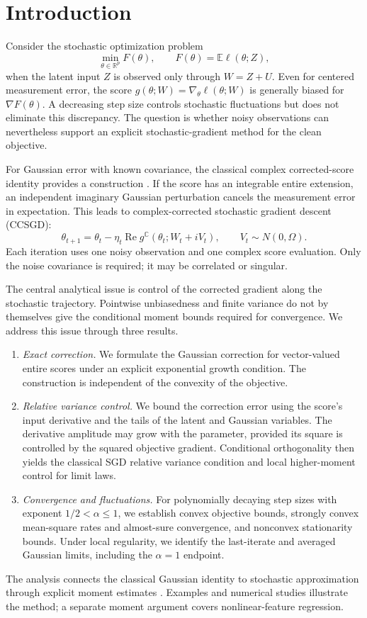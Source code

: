 \section{Introduction}

Consider the stochastic optimization problem
\[
\min_{\theta\in\mathbb R^p}F(\theta),\qquad
F(\theta)=\mathbb E\ell(\theta;Z),
\]
when the latent input $Z$ is observed only through $W=Z+U$.
Even for centered measurement error, the score
$g(\theta;W)=\nabla_\theta\ell(\theta;W)$ is generally biased for
$\nabla F(\theta)$. A decreasing step size controls stochastic
fluctuations but does not eliminate this discrepancy. The question is
whether noisy observations can nevertheless support an explicit
stochastic-gradient method for the clean objective.

For Gaussian error with known covariance, the classical complex
corrected-score identity provides a construction
\cite{stefanski1989,novick2002}. If the score has an integrable entire
extension, an independent imaginary Gaussian perturbation cancels the
measurement error in expectation. This leads to complex-corrected
stochastic gradient descent (CCSGD):
\[
\theta_{t+1}=\theta_t-\eta_t\operatorname{Re}
g^{\mathbb C}(\theta_t;W_t+iV_t),\qquad
V_t\sim N(0,\Omega).
\]
Each iteration uses one noisy observation and one complex score evaluation.
Only the noise covariance is required; it may be correlated or singular.

The central analytical issue is control of the corrected gradient along
the stochastic trajectory. Pointwise unbiasedness and finite variance
do not by themselves give the conditional moment bounds required for
convergence. We address this issue through three results.
\begin{enumerate}
\item \emph{Exact correction.}
We formulate the Gaussian correction for vector-valued entire scores
under an explicit exponential growth condition. The construction is
independent of the convexity of the objective.
\item \emph{Relative variance control.}
We bound the correction error using the score's input derivative and
the tails of the latent and Gaussian variables. The derivative amplitude
may grow with the parameter, provided its square is controlled by the
squared objective gradient. Conditional orthogonality then yields the
classical SGD relative variance condition and local higher-moment control
for limit laws.
\item \emph{Convergence and fluctuations.}
For polynomially decaying step sizes with exponent $1/2<\alpha\le1$,
we establish convex objective bounds, strongly convex mean-square rates
and almost-sure convergence, and nonconvex stationarity bounds.
Under local regularity, we identify the last-iterate and averaged
Gaussian limits, including the $\alpha=1$ endpoint.
\end{enumerate}
The analysis connects the classical Gaussian identity to stochastic
approximation through explicit moment estimates
\cite{novick2002,fabian1968,polyakjuditsky1992}. Examples and numerical
studies illustrate the method; a separate moment argument covers
nonlinear-feature regression.
